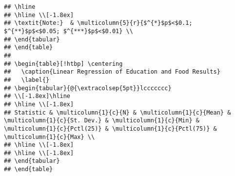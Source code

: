 \documentclass[]{article}
\begin{document}
\begin{verbatim}
## \hline 
## \hline \\[-1.8ex] 
## \textit{Note:}  & \multicolumn{5}{r}{$^{*}$p$<$0.1; $^{**}$p$<$0.05; $^{***}$p$<$0.01} \\ 
## \end{tabular} 
## \end{table} 
## 
## \begin{table}[!htbp] \centering 
##   \caption{Linear Regression of Education and Food Results} 
##   \label{} 
## \begin{tabular}{@{\extracolsep{5pt}}lccccccc} 
## \\[-1.8ex]\hline 
## \hline \\[-1.8ex] 
## Statistic & \multicolumn{1}{c}{N} & \multicolumn{1}{c}{Mean} & \multicolumn{1}{c}{St. Dev.} & \multicolumn{1}{c}{Min} & \multicolumn{1}{c}{Pctl(25)} & \multicolumn{1}{c}{Pctl(75)} & \multicolumn{1}{c}{Max} \\ 
## \hline \\[-1.8ex] 
## \hline \\[-1.8ex] 
## \end{tabular} 
## \end{table}
\end{verbatim}
\end{document}
